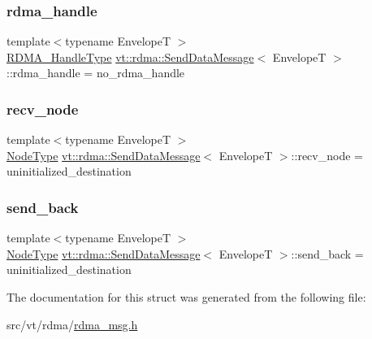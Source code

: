 \subsubsection{\texorpdfstring{rdma\+\_\+handle}{rdma\_handle}}
{\footnotesize\ttfamily template$<$typename EnvelopeT $>$ \\
\hyperlink{namespacevt_a10442579ec4e7ebef223818e64bcf908}{R\+D\+M\+A\+\_\+\+Handle\+Type} \hyperlink{structvt_1_1rdma_1_1_send_data_message}{vt\+::rdma\+::\+Send\+Data\+Message}$<$ EnvelopeT $>$\+::rdma\+\_\+handle = no\+\_\+rdma\+\_\+handle}

\mbox{\label{structvt_1_1rdma_1_1_send_data_message_ad825529ece23e2f7112f825a0e8b24e1}} 
\subsubsection{\texorpdfstring{recv\+\_\+node}{recv\_node}}
{\footnotesize\ttfamily template$<$typename EnvelopeT $>$ \\
\hyperlink{namespacevt_a866da9d0efc19c0a1ce79e9e492f47e2}{Node\+Type} \hyperlink{structvt_1_1rdma_1_1_send_data_message}{vt\+::rdma\+::\+Send\+Data\+Message}$<$ EnvelopeT $>$\+::recv\+\_\+node = uninitialized\+\_\+destination}

\mbox{\label{structvt_1_1rdma_1_1_send_data_message_a9dc041340e97f80049273da30b9214cb}} 
\subsubsection{\texorpdfstring{send\+\_\+back}{send\_back}}
{\footnotesize\ttfamily template$<$typename EnvelopeT $>$ \\
\hyperlink{namespacevt_a866da9d0efc19c0a1ce79e9e492f47e2}{Node\+Type} \hyperlink{structvt_1_1rdma_1_1_send_data_message}{vt\+::rdma\+::\+Send\+Data\+Message}$<$ EnvelopeT $>$\+::send\+\_\+back = uninitialized\+\_\+destination}



The documentation for this struct was generated from the following file\+:\begin{DoxyCompactItemize}
\item 
src/vt/rdma/\hyperlink{rdma__msg_8h}{rdma\+\_\+msg.\+h}\end{DoxyCompactItemize}
